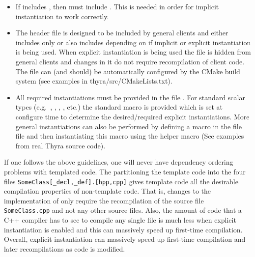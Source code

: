 \begin{itemize}
\begin{itemize}
\item If  includes
  , then  must
  include .  This is needed in order for
  implicit instantiation to work correctly.

\item The header file  is designed to be included
  by general clients and either includes only
   or also includes 
  depending on if implicit or explicit instantiation is being used.
  When explicit instantiation is being used the file
   is hidden from general clients and changes
  in it do not require recompilation of client code.  The file
   can (and should) be automatically configured by
  the CMake build system (see examples in thyra/src/CMakeLists.txt).

\item All required instantiations must be provided in the file
  .  For standard scalar types (e.g.\ ,
  , , ,
  etc.) the standard macro
   is
  provided which is set at configure time to determine the
  desired/required explicit instantiations.  More general
  instantiations can also be performed by defining a macro in the file
   file and then instantiating this macro
  using the helper macro
   (See
  examples from real Thyra source code).

\end{itemize}

If one follows the above guidelines, one will never have dependency
ordering problems with templated code.  The partitioning the template
code into the four files \texttt{SomeClass[\_decl,\_def].[hpp,cpp]}
gives template code all the desirable compilation properties of
non-template code.  That is, changes to the implementation of
 only require the recompilation of the source file
\texttt{SomeClass.cpp} and not any other source files.  Also, the
amount of code that a C++ compiler has to see to compile any single
 file is much less when explicit instantiation is enabled
and this can massively speed up first-time compilation.  Overall,
explicit instantiation can massively speed up first-time compilation
and later recompilations as code is modified.


\end{itemize}


